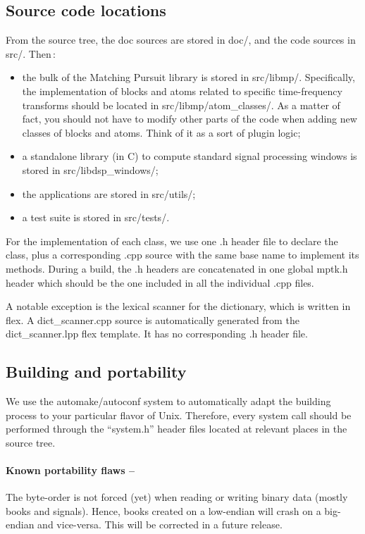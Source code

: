 \documentclass[11pt,a4paper]{article}
\begin{document}
\subsection{Source code locations}
From the source tree, the doc sources are stored in doc/, and the code sources
in src/. Then\,:
\begin{itemize}
\item the bulk of the Matching Pursuit library is stored in src/libmp/.
  Specifically, the implementation of blocks and atoms related to specific
  time-frequency transforms should be located in src/libmp/atom\_classes/. As a
  matter of fact, you should not have to modify other parts of the code when
  adding new classes of blocks and atoms. Think of it as a sort of plugin
  logic;
\item a standalone library (in C) to compute standard signal processing windows
  is stored in src/libdsp\_windows/;
\item the applications are stored in src/utils/;
\item a test suite is stored in src/tests/.
\end{itemize}
For the implementation of each class, we use one .h header file to declare the
class, plus a corresponding .cpp source with the same base name to implement
its methods. During a build, the .h headers are concatenated in one global
mptk.h header which should be the one included in all the individual .cpp
files.

A notable exception is the lexical scanner for the dictionary, which is written
in flex. A dict\_scanner.cpp source is automatically generated from the
dict\_scanner.lpp flex template. It has no corresponding .h header file.


\pagebreak
\subsection{Building and portability}
We use the automake/autoconf system to automatically adapt the building process
to your particular flavor of Unix. Therefore, every system call should be
performed through the ``system.h'' header files located at relevant places in
the source tree.

\paragraph{Known portability flaws --} The byte-order is not forced (yet) when
reading or writing binary data (mostly books and signals). Hence, books created
on a low-endian will crash on a big-endian and vice-versa. This will be
corrected in a future release.
\end{document}
